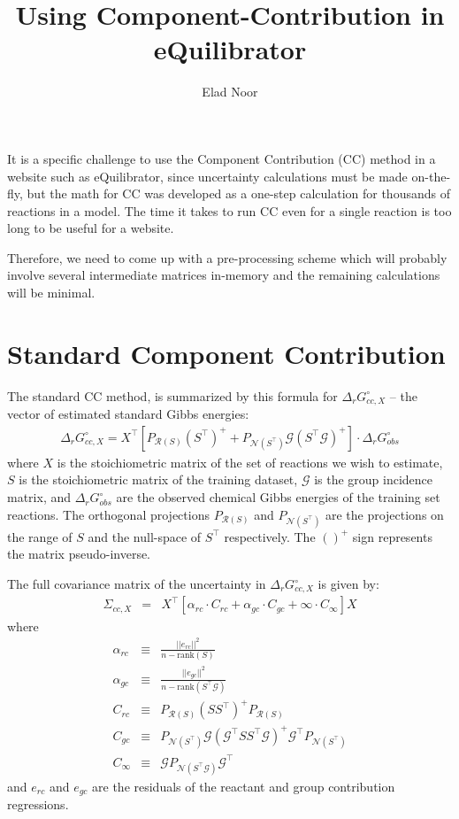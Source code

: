 \documentclass[11pt]{article}
\title{Using Component-Contribution in eQuilibrator}
\author{Elad Noor}
\newcommand{\Gmat}{\mathcal{G}}
\newcommand{\PRmat}[1]{P_{\mathcal{R}\left(#1\right)}}
\newcommand{\PNmat}[1]{P_{\mathcal{N}\left(#1\right)}}
\begin{document}
\maketitle

It is a specific challenge to use the Component Contribution (CC) method in a website such as eQuilibrator, since uncertainty calculations must be made on-the-fly, but the math for CC was developed as a one-step calculation for thousands of reactions in a model. The time it takes to run CC even for a single reaction is too long to be useful for a website.

Therefore, we need to come up with a pre-processing scheme which will probably involve several intermediate matrices in-memory and the remaining calculations will be minimal.

\section{Standard Component Contribution}
The standard CC method, is summarized by this formula for $\Delta_{r}G_{cc,X}^{\circ}$ -- the vector of estimated standard Gibbs energies:
\begin{eqnarray}\label{eq:cc}
\Delta_{r}G_{cc,X}^{\circ} = X^{\top} 
\left[ 
	\PRmat{S} \left(S^{\top}\right)^{+} +
	\PNmat{S^\top} \Gmat \left(S^{\top}\Gmat\right)^{+}
\right]
\cdot\Delta_{r}G_{obs}^{\circ}
\end{eqnarray}
where $X$ is the stoichiometric matrix of the set of reactions we wish to estimate, $S$ is the stoichiometric matrix of the training dataset, $\Gmat$ is the group incidence matrix, and $\Delta_{r}G_{obs}^{\circ}$ are the observed chemical Gibbs energies of the training set reactions. The orthogonal projections $P_{\mathcal{R}\left(S\right)}$ and $P_{\mathcal{N}(S^{\top})}$ are the projections on the range of $S$ and the null-space of $S^\top$ respectively. The $()^{+}$ sign represents the matrix pseudo-inverse.

The full covariance matrix of the uncertainty in $\Delta_{r}G_{cc,X}^{\circ}$ is given by:
\begin{eqnarray}
\Sigma_{cc,X} &=& X^{\top} \left[ \alpha_{rc}\cdot C_{rc} + \alpha_{gc}\cdot C_{gc} + \infty\cdot C_{\infty}  \right] X \label{eq:full_u}
\end{eqnarray}
where
\begin{eqnarray}
\alpha_{rc} &\equiv& \frac{||e_{rc}||^{2}}{n-\mbox{rank}(S)} \\
\alpha_{gc} &\equiv& \frac{||e_{gc}||^{2}}{n-\mbox{rank}(S^{\top}\Gmat)} \\
C_{rc} & \equiv & \PRmat{S} \left(SS^{\top}\right)^{+} \PRmat{S} \label{eq:c_rc}\\
C_{gc} & \equiv & \PNmat{S^\top} \Gmat \left(\Gmat^{\top}SS^{\top}\Gmat\right)^{+} \Gmat^{\top} \PNmat{S^\top} \\
C_{\infty} & \equiv & \Gmat \PNmat{S^\top\Gmat} \Gmat^{\top}
\end{eqnarray}
and $e_{rc}$ and $e_{gc}$ are the residuals of the reactant and group contribution regressions.
\end{document}
